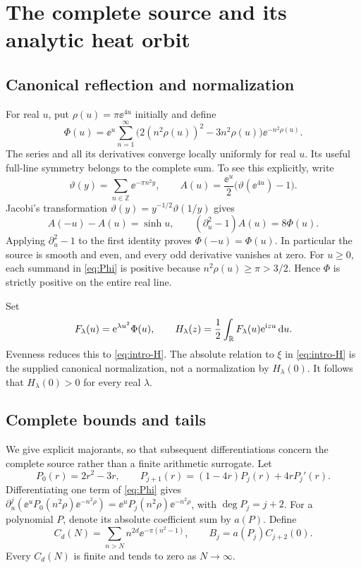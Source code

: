 \section{The complete source and its analytic heat orbit}\label{sec:source}

\subsection{Canonical reflection and normalization}
For real \(u\), put \(\rho(u)=\pi\ee^{4u}\) initially and define
\begin{equation}\label{eq:Phi}
 \Phi(u)=\ee^u\sum_{n=1}^\infty
 \bigl(2(n^2\rho(u))^2-3n^2\rho(u)\bigr)\ee^{-n^2\rho(u)}.
\end{equation}
The series and all its derivatives converge locally uniformly for real
\(u\). Its useful full-line symmetry belongs to the complete sum.
To see this explicitly, write
\[
 \vartheta(y)=\sum_{n\in\mathbb Z}\ee^{-\pi n^2y},\qquad
 A(u)=\frac{\ee^u}{2}\bigl(\vartheta(\ee^{4u})-1\bigr).
\]
Jacobi's transformation \(\vartheta(y)=y^{-1/2}\vartheta(1/y)\)
\cite{DLMFThetaModular} gives
\[
 A(-u)-A(u)=\sinh u,\qquad (\partial_u^2-1)A(u)=8\Phi(u).
\]
Applying \(\partial_u^2-1\) to the first identity proves
\(\Phi(-u)=\Phi(u)\). In particular the source is smooth and even, and
every odd derivative vanishes at zero. For \(u\geq0\), each summand in
\eqref{eq:Phi} is positive because \(n^2\rho(u)\geq\pi>3/2\).
Hence \(\Phi\) is strictly positive on the entire real line.

Set
\begin{equation}\label{eq:F-H}
 F_\lambda(u)=\mathrm e^{\lambda u^2}\Phi(u),\qquad
 H_\lambda(z)=\frac12\int_\mathbb R F_\lambda(u)\mathrm e^{\mathrm i zu}\,\mathrm d u.
\end{equation}
Evenness reduces this to \eqref{eq:intro-H}. The absolute relation to
\(\xi\) in \eqref{eq:intro-H} is the supplied canonical normalization,
not a normalization by \(H_\lambda(0)\). It follows that
\(H_\lambda(0)>0\) for every real \(\lambda\).

\subsection{Complete bounds and tails}
We give explicit majorants, so that subsequent differentiations concern
the complete source rather than a finite arithmetic surrogate.
Let
\begin{equation}\label{eq:P-rec}
 P_0(r)=2r^2-3r,\qquad
 P_{j+1}(r)=(1-4r)P_j(r)+4rP_j'(r).
\end{equation}
Differentiating one term of \eqref{eq:Phi} gives
\(\partial_u^j(\ee^u P_0(n^2\rho)\ee^{-n^2\rho})
=\ee^u P_j(n^2\rho)\ee^{-n^2\rho}\), with \(\deg P_j=j+2\).
For a polynomial \(P\), denote its absolute coefficient sum by \(a(P)\).
Define
\begin{equation}\label{eq:C-B}
 C_d(N)=\sum_{n>N}n^{2d}\ee^{-\pi(n^2-1)},\qquad
 B_j=a(P_j)C_{j+2}(0).
\end{equation}
Every \(C_d(N)\) is finite and tends to zero as \(N\to\infty\).

